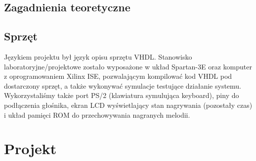 \documentclass[a4paper,11pt]{article}
\begin{document}
\subsection{Zagadnienia teoretyczne}

\subsection{Sprzęt}
Językiem projektu był język opisu sprzętu VHDL. Stanowisko laboratoryjne/projektowe zostało wyposażone w układ Spartan-3E oraz komputer z oprogramowaniem Xilinx ISE, pozwalającym kompilować kod VHDL pod dostarczony sprzęt, a także wykonywać symulacje testujące działanie systemu. Wykorzystaliśmy także port PS/2 (klawiatura symulująca keyboard), piny do podłączenia głośnika, ekran LCD wyświetlający stan nagrywania (pozostały czas) i układ pamięci ROM do przechowywania nagranych melodii.

\section{Projekt}
\end{document}
